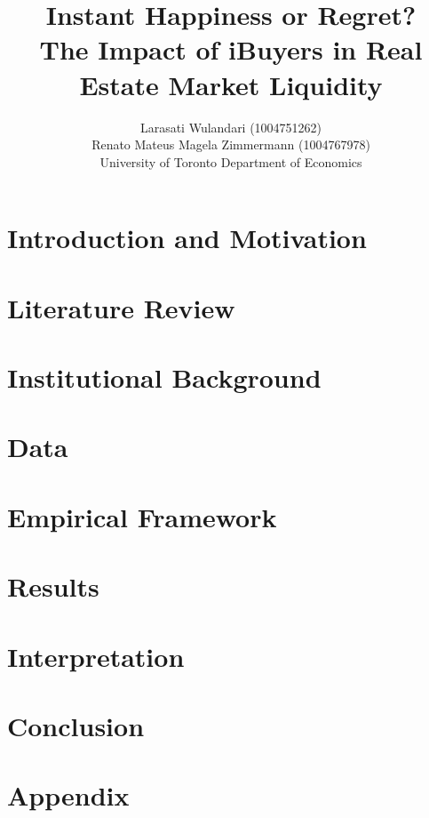 \documentclass{article}
\title{Instant Happiness or Regret? \\
\Large The Impact of iBuyers in Real Estate Market Liquidity \\
}
\author{
    Larasati Wulandari (1004751262) \\
    Renato Mateus Magela Zimmermann (1004767978)    \\
    University of Toronto Department of Economics
}
\begin{document}
\doublespacing

\maketitle



\twocolumn

\section{Introduction and Motivation}



\section{Literature Review}



\section{Institutional Background}



\section{Data}



\section{Empirical Framework}\label{empirical_framework}



\section{Results}



\section{Interpretation}



\section{Conclusion}



\medskip



\pagebreak
\onecolumn

\section{Appendix}


\end{document}

